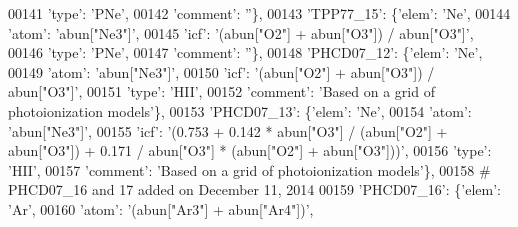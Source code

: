 \begin{DoxyCode}
00141                                       \textcolor{stringliteral}{'type'}: \textcolor{stringliteral}{'PNe'},
00142                                       \textcolor{stringliteral}{'comment'}: \textcolor{stringliteral}{''}\},
00143                          \textcolor{stringliteral}{'TPP77\_15'}: \{\textcolor{stringliteral}{'elem'}: \textcolor{stringliteral}{'Ne'},
00144                                       \textcolor{stringliteral}{'atom'}: \textcolor{stringliteral}{'abun["Ne3"]'},
00145                                       \textcolor{stringliteral}{'icf'}: \textcolor{stringliteral}{'(abun["O2"] + abun["O3"]) / abun["O3"]'},
00146                                       \textcolor{stringliteral}{'type'}: \textcolor{stringliteral}{'PNe'},
00147                                       \textcolor{stringliteral}{'comment'}: \textcolor{stringliteral}{''}\},
00148                          \textcolor{stringliteral}{'PHCD07\_12'}: \{\textcolor{stringliteral}{'elem'}: \textcolor{stringliteral}{'Ne'},
00149                                        \textcolor{stringliteral}{'atom'}: \textcolor{stringliteral}{'abun["Ne3"]'},
00150                                        \textcolor{stringliteral}{'icf'}: \textcolor{stringliteral}{'(abun["O2"] + abun["O3"]) / abun["O3"]'},
00151                                        \textcolor{stringliteral}{'type'}: \textcolor{stringliteral}{'HII'},
00152                                        \textcolor{stringliteral}{'comment'}: \textcolor{stringliteral}{'Based on a grid of photoionization models'}\},
00153                          \textcolor{stringliteral}{'PHCD07\_13'}: \{\textcolor{stringliteral}{'elem'}: \textcolor{stringliteral}{'Ne'},
00154                                        \textcolor{stringliteral}{'atom'}: \textcolor{stringliteral}{'abun["Ne3"]'},
00155                                        \textcolor{stringliteral}{'icf'}: \textcolor{stringliteral}{'(0.753 + 0.142 * abun["O3"] / (abun["O2"] + abun["O3"]) +
       0.171 / abun["O3"] * (abun["O2"] + abun["O3"]))'},
00156                                        \textcolor{stringliteral}{'type'}: \textcolor{stringliteral}{'HII'},
00157                                        \textcolor{stringliteral}{'comment'}: \textcolor{stringliteral}{'Based on a grid of photoionization models'}\},
00158 \textcolor{comment}{# PHCD07\_16 and 17 added on December 11, 2014}
00159                          \textcolor{stringliteral}{'PHCD07\_16'}: \{\textcolor{stringliteral}{'elem'}: \textcolor{stringliteral}{'Ar'},
00160                                        \textcolor{stringliteral}{'atom'}: \textcolor{stringliteral}{'(abun["Ar3"] + abun["Ar4"])'},

\end{DoxyCode}

